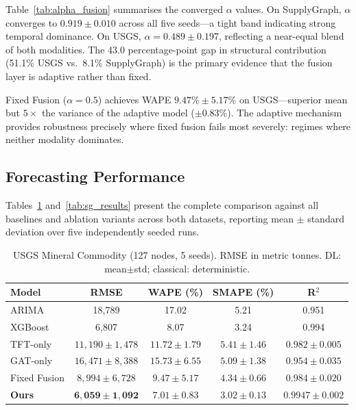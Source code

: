 Table~\ref{tab:alpha_fusion} summarises the converged $\alpha$
values. On SupplyGraph, $\alpha$ converges to $0.919{\pm}0.010$
across all five seeds---a tight band indicating strong temporal
dominance. On USGS, $\alpha{=}0.489{\pm}0.197$, reflecting a
near-equal blend of both modalities. The 43.0 percentage-point
gap in structural contribution (51.1\% USGS vs.\ 8.1\%
SupplyGraph) is the primary evidence that the fusion layer is
adaptive rather than fixed.

Fixed Fusion ($\alpha{=}0.5$) achieves WAPE
$9.47\%{\pm}5.17\%$ on USGS---superior mean but $5{\times}$ the
variance of the adaptive model ($\pm 0.83\%$). The adaptive
mechanism provides robustness precisely where fixed fusion fails
most severely: regimes where neither modality dominates.

\subsection{Forecasting Performance}

Tables~\ref{tab:usgs_results} and~\ref{tab:sg_results} present the
complete comparison against all baselines and ablation variants across
both datasets, reporting mean $\pm$ standard deviation over five
independently seeded runs.

\begin{table}[!t]
\caption{USGS Mineral Commodity (127 nodes, 5 seeds).
RMSE in metric tonnes. DL: mean$\pm$std; classical: deterministic.}
\label{tab:usgs_results}
\centering\small\setlength{\tabcolsep}{4pt}
\begin{tabular}{lcccc}
\hline
Model & RMSE & WAPE (\%) & SMAPE (\%) & R$^2$ \\
\hline
ARIMA~\cite{hyndman2018fpp}   & 18{,}789 & 17.02 & 5.21 & 0.951 \\
XGBoost~\cite{chen2016xgboost}& 6{,}807  & 8.07  & 3.24 & 0.994 \\
\hline
TFT-only~\cite{lim2021tft}   & $11{,}190{\pm}1{,}478$ & $11.72{\pm}1.79$ & $5.41{\pm}1.46$ & $0.982{\pm}0.005$ \\
GAT-only~\cite{velickovic2018gat}&$16{,}471{\pm}8{,}388$&$15.73{\pm}6.55$&$5.09{\pm}1.38$&$0.954{\pm}0.035$\\
Fixed Fusion                  & $8{,}994{\pm}6{,}728$ & $9.47{\pm}5.17$ & $4.34{\pm}0.66$ & $0.984{\pm}0.020$ \\
\textbf{Ours}                 &$\mathbf{6{,}059{\pm}1{,}092}$&$\mathbf{7.01{\pm}0.83}$&$\mathbf{3.02{\pm}0.13}$&$\mathbf{0.9947{\pm}0.002}$\\
\hline
\end{tabular}
\end{table}

